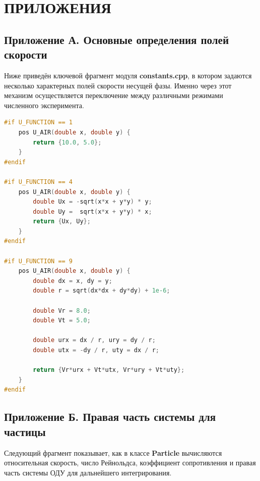 \documentclass[14pt,a4paper]{extarticle}
\numberwithin{figure}{section}
\numberwithin{table}{section}
\begin{document}

\FloatBarrier
\clearpage
\section*{ПРИЛОЖЕНИЯ}

\subsection*{Приложение А. Основные определения полей скорости}

Ниже приведён ключевой фрагмент модуля \textbf{constants.cpp}, в котором задаются
несколько характерных полей скорости несущей фазы. Именно через этот механизм
осуществляется переключение между различными режимами численного эксперимента.

\begin{lstlisting}[style=diplomacode,language=C++,caption={Фрагмент файла constants.cpp: задания нескольких полей скорости}]
#if U_FUNCTION == 1
    pos U_AIR(double x, double y) {
        return {10.0, 5.0};
    }
#endif

#if U_FUNCTION == 4
    pos U_AIR(double x, double y) {
        double Ux = -sqrt(x*x + y*y) * y;
        double Uy =  sqrt(x*x + y*y) * x;
        return {Ux, Uy};
    }
#endif

#if U_FUNCTION == 9
    pos U_AIR(double x, double y) {
        double dx = x, dy = y;
        double r = sqrt(dx*dx + dy*dy) + 1e-6;

        double Vr = 8.0;
        double Vt = 5.0;

        double urx = dx / r, ury = dy / r;
        double utx = -dy / r, uty = dx / r;

        return {Vr*urx + Vt*utx, Vr*ury + Vt*uty};
    }
#endif
\end{lstlisting}

\subsection*{Приложение Б. Правая часть системы для частицы}

Следующий фрагмент показывает, как в классе \textbf{Particle} вычисляются
относительная скорость, число Рейнольдса, коэффициент сопротивления и правая
часть системы ОДУ для дальнейшего интегрирования.
\end{document}
